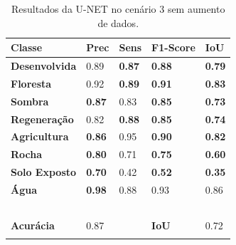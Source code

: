 \documentclass[%
  10pt,%
  aspectratio = 169,%
  compress,%
  t,%
  english,%
  brazilian,%
  tikz,
]{beamer}
\begin{document}
\begin{frame}
\begin{columns}[T]
\begin{table}[!ht]
    \centering
    \caption{Resultados da U-NET no cenário 3 sem aumento de dados.}%
    \label{tab:res:cen32}%
    \begin{tabular}{lllll}
    \toprule
        \textbf{Classe} & \textbf{Prec} & \textbf{Sens} & \textbf{F1-Score} & \textbf{IoU} \\
        \midrule
        \textbf{Desenvolvida}               & 0.89 & \textbf{0.87} & \textbf{0.88} & \textbf{0.79} \\ 
        \textbf{Floresta}                   & 0.92 & \textbf{0.89} & \textbf{0.91} & \textbf{0.83} \\ 
        \textbf{Sombra}                     & \textbf{0.87} & 0.83 & \textbf{0.85} & \textbf{0.73} \\ 
        \textbf{Regeneração}                & 0.82 & \textbf{0.88} & \textbf{0.85} & \textbf{0.74} \\ 
        \textbf{Agricultura}                & \textbf{0.86} & 0.95 & \textbf{0.90} & \textbf{0.82} \\ 
        \textbf{Rocha}                      & \textbf{0.80} & 0.71 & \textbf{0.75} & \textbf{0.60} \\ 
        \textbf{Solo Exposto}               & \textbf{0.70} & 0.42 & \textbf{0.52} & \textbf{0.35} \\ 
        \textbf{Água}                       & \textbf{0.98} & 0.88 & 0.93 & 0.86 \\ 
        \textbf{} & ~ & ~ & ~ & ~ \\ 
        \textbf{Acurácia} & \colorbox{green!25}{0.87} & ~ & \textbf{IoU} & \colorbox{green!25}{0.72} \\
        \bottomrule
        \addlinespace
    \end{tabular}
\end{table}

\end{columns}
\end{frame}
\end{document}
